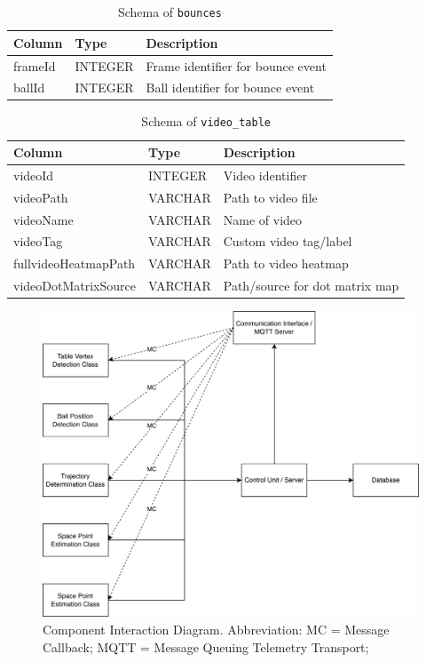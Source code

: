 \documentclass[conference]{IEEEtran}
\begin{document}
\begin{table}[ht]
    \centering
    \caption{Schema of \texttt{bounces}}
    \label{tab:bounces}
    \begin{tabular}{|l|l|l|}
        \hline
        \textbf{Column} & \textbf{Type} & \textbf{Description} \\
        \hline
        frameId         & INTEGER       & Frame identifier for bounce event \\
        ballId          & INTEGER       & Ball identifier for bounce event \\
        \hline
    \end{tabular}
\end{table}

\begin{table}[ht]
    \centering
    \caption{Schema of \texttt{video\_table}}
    \label{tab:videotable}
    \begin{tabular}{|l|l|l|}
        \hline
        \textbf{Column}           & \textbf{Type}    & \textbf{Description} \\
        \hline
        videoId                   & INTEGER         & Video identifier \\
        videoPath                 & VARCHAR         & Path to video file \\
        videoName                 & VARCHAR         & Name of video \\
        videoTag                  & VARCHAR         & Custom video tag/label \\
        fullvideoHeatmapPath      & VARCHAR         & Path to video heatmap \\
        videoDotMatrixSource      & VARCHAR         & Path/source for dot matrix map \\
        \hline
    \end{tabular}
\end{table}


\begin{figure}
    \centering
    \includegraphics[width=1\linewidth]{Component Interaction Diagram.png}
    \caption{Component Interaction Diagram. Abbreviation: MC = Message Callback; MQTT = Message Queuing Telemetry Transport;}
    \label{fig:placeholder}
\end{figure}
\end{document}
